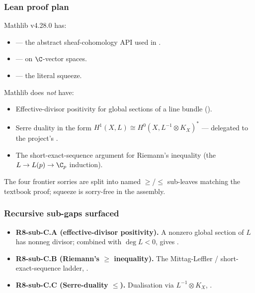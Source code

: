 \subsubsection*{Lean proof plan}

Mathlib v4.28.0 has:
\begin{itemize}
\item {} --- the abstract
  sheaf-cohomology API used in
  .
\item {} ---
   on \(\C\)-vector spaces.
\item {} --- the literal squeeze.
\end{itemize}

Mathlib does \emph{not} have:
\begin{itemize}
\item Effective-divisor positivity for global sections of a line
  bundle ().
\item Serre duality in the form
  \(H^{1}(X,L)\cong H^{0}(X,L^{-1}\otimes K_{X})^{*}\) ---
  delegated to the project's
  .
\item The short-exact-sequence argument for Riemann's inequality
  (the \(L\to L(p)\to\C_{p}\) induction).
\end{itemize}

The four frontier sorries are split into named \(\geq\)/\(\leq\)
sub-leaves matching the textbook proof; squeeze is sorry-free in
the  assembly.

\subsubsection*{Recursive sub-gaps surfaced}

\begin{itemize}
\item \textbf{R8-sub-C.A (effective-divisor positivity).}  A nonzero
  global section of \(L\) has nonneg divisor; combined with
  \(\deg L<0\), gives .
\item \textbf{R8-sub-C.B (Riemann's \(\geq\) inequality).}  The
  Mittag-Leffler / short-exact-sequence ladder,
  .
\item \textbf{R8-sub-C.C (Serre-duality \(\leq\)).}  Dualisation
  via \(L^{-1}\otimes K_{X}\),
  .
\end{itemize}

